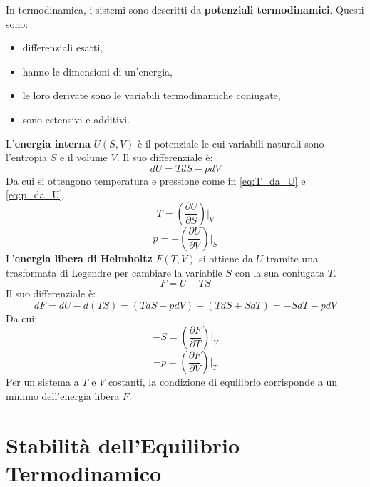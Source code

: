 In termodinamica, i sistemi sono descritti da \textbf{potenziali termodinamici}. Questi sono:
\begin{itemize}
    \item differenziali esatti,
    \item hanno le dimensioni di un'energia,
    \item le loro derivate sono le variabili termodinamiche coniugate,
    \item sono estensivi e additivi.
\end{itemize}
L'\textbf{energia interna} $U(S,V)$ è il potenziale le cui variabili naturali sono l'entropia $S$ e il volume $V$. Il suo differenziale è:
\begin{equation}
    dU=TdS-pdV
    \label{eq:dU}
\end{equation}
Da cui si ottengono temperatura e pressione come in \eqref{eq:T_da_U} e \eqref{eq:p_da_U}.
\begin{equation}
    T=\left(\frac{\partial U}{\partial S}\right)\Big|_{V}
    \label{eq:T_da_U}
\end{equation}
\begin{equation}
    p=-\left(\frac{\partial U}{\partial V}\right)\Big|_{S}
    \label{eq:p_da_U}
\end{equation}
L'\textbf{energia libera di Helmholtz} $F(T,V)$ si ottiene da $U$ tramite una trasformata di Legendre per cambiare la variabile $S$ con la sua coniugata $T$.
\begin{equation}
    F = U - TS
    \label{eq:def_F}
\end{equation}
Il suo differenziale è:
\begin{equation}
    dF = dU - d(TS) = (TdS - pdV) - (TdS + SdT) = -SdT - pdV
    \label{eq:dF}
\end{equation}
Da cui:
\begin{equation}
    -S=\left(\frac{\partial F}{\partial T}\right)\Big|_{V}
    \label{eq:S_da_F}
\end{equation}
\begin{equation}
    -p=\left(\frac{\partial F}{\partial V}\right)\Big|_{T}
    \label{eq:p_da_F}
\end{equation}
Per un sistema a $T$ e $V$ costanti, la condizione di equilibrio corrisponde a un minimo dell'energia libera $F$.

\section{Stabilità dell'Equilibrio Termodinamico}

